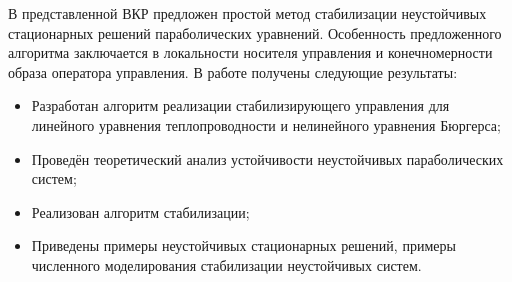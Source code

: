 \Conclusion
\vspace{2em}

В представленной ВКР предложен простой метод стабилизации неустойчивых
стационарных решений параболических уравнений. Особенность предложенного
алгоритма заключается в локальности носителя управления и конечномерности образа
оператора управления. В работе получены следующие результаты:

\begin{itemize}

\item{Разработан алгоритм реализации стабилизирующего
управления для линейного уравнения теплопроводности и нелинейного уравнения
Бюргерса;}

\item{Проведён теоретический анализ устойчивости неустойчивых параболических
систем;}

\item{Реализован алгоритм стабилизации;}

\item{Приведены примеры неустойчивых стационарных решений, примеры численного 
моделирования стабилизации неустойчивых систем.}

\end{itemize}
